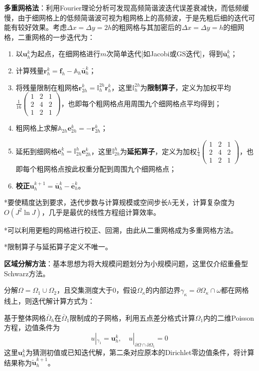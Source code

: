 \documentclass[a4paper,UTF8,fontset=windows]{ctexart}
\newcommand*{\bu}{\mathbf{u}}
\begin{document}
\textbf{多重网格法}：利用Fourier理论分析可发现高频简谐波迭代误差衰减快，而低频缓慢，由于细网格上的低频简谐波可视为粗网格上的高频波，于是先粗后细的迭代可能有较好效果。考虑$\Delta x=\Delta y=2h$的粗网格与其加密后的$\Delta x=\Delta y=h$的细网格，二重网格的一步迭代为：
\begin{enumerate}
    \item 以$\bu_h^k$为起点，在细网格进行$m$次简单迭代[如Jacobi或GS迭代]，得到$\bar{\bu}_h^k$；
    \item 计算残量$\mathbf{r}_h^k=\mathbf{f}_h-\mathbb{A}_h\bar{\bu}_h^k$；
    \item 将残量限制在粗网格$\mathbf{r}_{2h}^k=\mathbb{I}_h^{2h}\mathbf{r}_h^k$，这里$\mathbb{I}_h^{2h}$为\textbf{限制算子}，定义为加权平均$\frac{1}{16}\begin{pmatrix}1&2&1\\2&4&2\\1&2&1\end{pmatrix}$，也即每个粗网格点用周围九个细网格点平均得到；
    \item 粗网格上求解$\mathbb{A}_{2h}\mathbf{e}_{2h}^k=-\mathbf{r}_{2h}^k$；
    \item 延拓到细网格$\bar{\mathbf{e}}_h^k=\mathbb{I}_{2h}^h\mathbf{e}_{2h}^k$，这里$\mathbb{I}_{2h}^{h}$为\textbf{延拓算子}，定义为加权$\frac{1}{4}\begin{pmatrix}1&2&1\\2&4&2\\1&2&1\end{pmatrix}$，也即每个粗网格点按此权重分配到周围九个细网格点；
    \item \textbf{校正}$\mathbf{u}_h^{k+1}=\bar{\bu}_h^k-\bar{\mathbf{e}}_h^k$。
\end{enumerate}

*要使精度达到要求，迭代步数与计算规模或空间步长$h$无关，计算复杂度为$O(J^2\ln J)$，几乎是最优的线性方程组计算效率。

*可以利用更粗的网格进行校正、回溯，由此从二重网格成为多重网格方法。

*限制算子与延拓算子定义不唯一。

\textbf{区域分解方法}：基本思想为将大规模问题划分为小规模问题，这里仅介绍重叠型Schwarz方法。

分解$\Omega=\Omega_1\cup\Omega_2$，且交集测度大于0，假设$\Omega_\kappa$的内部边界$\gamma_\kappa=\partial\Omega_\kappa\cap\omega$都在网格线上，则迭代解计算方式为：

基于整体网格$\bar{\Omega}_h$在$\bar{\Omega}_1$限制成的子网格，利用五点差分格式计算$\Omega_1$内的二维Poisson方程，边值条件为
$$u|_{\gamma_1}=\bu_h^k,\quad u|_{\partial\Omega\cap\partial\Omega_1}=0$$
这里$\bu_h^k$为猜测初值或已知迭代解，第二条对应原本的Dirichlet零边值条件，将计算结果称为$\tilde{\bu}_h^{k+1}$。
\end{document}
